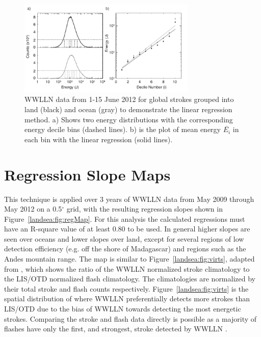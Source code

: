 \begin{figure}[ht!]
   \centering
   \noindent\includegraphics[width=20pc]{LandSea/Figures/1_linearRegression.pdf} 
   \caption{WWLLN data from 1-15 June 2012 for global strokes grouped into land (black) and ocean (gray) to demonstrate the linear regression method. a) Shows two energy distributions with the corresponding energy decile bins (dashed lines). b) is the plot of mean energy $\overline{E_i}$ in each bin with the linear regression (solid lines).}
   \label{landsea:fig:linRegTheory}
\end{figure}

\section{Regression Slope Maps}

This technique is applied over 3 years of WWLLN data from May 2009 through May 2012 on a 0.5$^\circ$ grid, with the resulting regression slopes shown in Figure~\ref{landsea:fig:regMap}.
For this analysis the calculated regressions must have an R-square value of at least 0.80 to be used.
In general higher slopes are seen over oceans and lower slopes over land, except for several regions of low detection efficiency (e.g. off the shore of Madagascar) and regions such as the Andes mountain range.
The map is similar to Figure~\ref{landsea:fig:virts}, adapted from \citet{Virts2013}, which shows the ratio of the WWLLN normalized stroke climatology to the LIS/OTD normalized flash climatology.
The climatologies are normalized by their total stroke and flash counts respectively.
Figure~\ref{landsea:fig:virts} is the spatial distribution of where WWLLN preferentially detects more strokes than LIS/OTD due to the bias of WWLLN towards detecting the most energetic strokes.
Comparing the stroke and flash data directly is possible as a majority of flashes have only the first, and strongest, stroke detected by WWLLN \citep{Abarca2010}.

